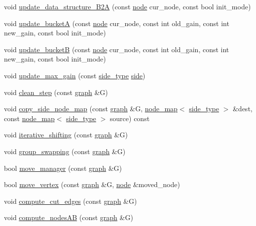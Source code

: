 \begin{DoxyCompactItemize}
\item 
void \mbox{\hyperlink{classratio__cut__partition_a942a3a035f59f2ab0d1d62da3c878eb8}{update\+\_\+data\+\_\+structure\+\_\+\+B2A}} (const \mbox{\hyperlink{classnode}{node}} cur\+\_\+node, const bool init\+\_\+mode)
\item 
void \mbox{\hyperlink{classratio__cut__partition_acbd0608a7e5560a52c447711cb59a644}{update\+\_\+bucketA}} (const \mbox{\hyperlink{classnode}{node}} cur\+\_\+node, const int old\+\_\+gain, const int new\+\_\+gain, const bool init\+\_\+mode)
\item 
void \mbox{\hyperlink{classratio__cut__partition_abe5d474e6d99c7bb200071d6484b5358}{update\+\_\+bucketB}} (const \mbox{\hyperlink{classnode}{node}} cur\+\_\+node, const int old\+\_\+gain, const int new\+\_\+gain, const bool init\+\_\+mode)
\item 
void \mbox{\hyperlink{classratio__cut__partition_afbe33417996a8e040d4d802a1116e134}{update\+\_\+max\+\_\+gain}} (const \mbox{\hyperlink{classratio__cut__partition_ace53442bd0c1e21fbf00858ec6f6b456}{side\+\_\+type}} \mbox{\hyperlink{classratio__cut__partition_a2bf913d1d8607747885177a3b585e611}{side}})
\item 
void \mbox{\hyperlink{classratio__cut__partition_aa8e1c0cce3f126e1aa4a3aa8489986fa}{clean\+\_\+step}} (const \mbox{\hyperlink{classgraph}{graph}} \&G)
\item 
void \mbox{\hyperlink{classratio__cut__partition_a8662bd1471d93d270de1c99d32ff3534}{copy\+\_\+side\+\_\+node\+\_\+map}} (const \mbox{\hyperlink{classgraph}{graph}} \&G, \mbox{\hyperlink{classnode__map}{node\+\_\+map}}$<$ \mbox{\hyperlink{classratio__cut__partition_ace53442bd0c1e21fbf00858ec6f6b456}{side\+\_\+type}} $>$ \&dest, const \mbox{\hyperlink{classnode__map}{node\+\_\+map}}$<$ \mbox{\hyperlink{classratio__cut__partition_ace53442bd0c1e21fbf00858ec6f6b456}{side\+\_\+type}} $>$ source) const
\item 
void \mbox{\hyperlink{classratio__cut__partition_a758382177ff8be996d0be78a3cca069b}{iterative\+\_\+shifting}} (const \mbox{\hyperlink{classgraph}{graph}} \&G)
\item 
void \mbox{\hyperlink{classratio__cut__partition_ae257dadc6cea5aef11badb68eadba0a5}{group\+\_\+swapping}} (const \mbox{\hyperlink{classgraph}{graph}} \&G)
\item 
bool \mbox{\hyperlink{classratio__cut__partition_a16997844577ee3284a2b6fddbbea8c37}{move\+\_\+manager}} (const \mbox{\hyperlink{classgraph}{graph}} \&G)
\item 
bool \mbox{\hyperlink{classratio__cut__partition_a2dbe8b4e73ac88fe6a9a2403ca35eb3f}{move\+\_\+vertex}} (const \mbox{\hyperlink{classgraph}{graph}} \&G, \mbox{\hyperlink{classnode}{node}} \&moved\+\_\+node)
\item 
void \mbox{\hyperlink{classratio__cut__partition_a5588508593940888323121b340b40477}{compute\+\_\+cut\+\_\+edges}} (const \mbox{\hyperlink{classgraph}{graph}} \&G)
\item 
void \mbox{\hyperlink{classratio__cut__partition_a39341e2459485a3f5367081ff208e769}{compute\+\_\+nodes\+AB}} (const \mbox{\hyperlink{classgraph}{graph}} \&G)
\end{DoxyCompactItemize}
